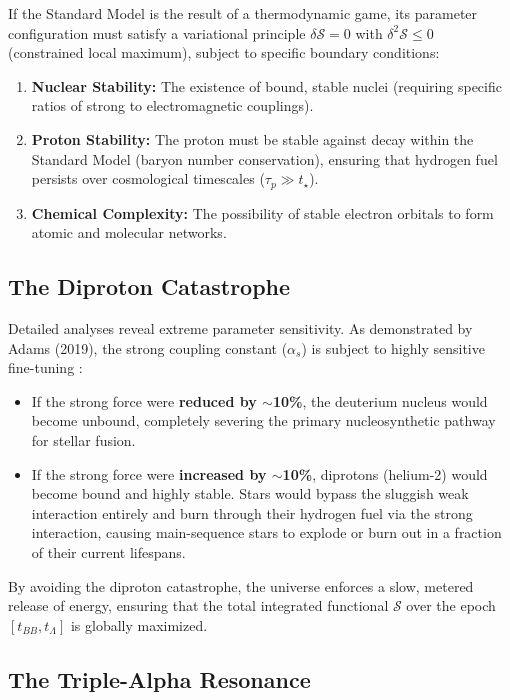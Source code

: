 \documentclass[12pt,a4paper]{article}
\theoremstyle{remark}
\begin{document}
If the Standard Model is the result of a thermodynamic game, its parameter configuration must satisfy a variational principle $\delta \mathcal{S} = 0$ with $\delta^2 \mathcal{S} \leq 0$ (constrained local maximum), subject to specific boundary conditions:
\begin{enumerate}
    \item \textbf{Nuclear Stability:} The existence of bound, stable nuclei (requiring specific ratios of strong to electromagnetic couplings).
    \item \textbf{Proton Stability:} The proton must be stable against decay within the Standard Model (baryon number conservation), ensuring that hydrogen fuel persists over cosmological timescales ($\tau_p \gg t_\star$).
    \item \textbf{Chemical Complexity:} The possibility of stable electron orbitals to form atomic and molecular networks.
\end{enumerate}

\subsection{The Diproton Catastrophe}

Detailed analyses reveal extreme parameter sensitivity. As demonstrated by Adams (2019), the strong coupling constant ($\alpha_s$) is subject to highly sensitive fine-tuning \citep{Adams2019}:

\begin{itemize}
    \item If the strong force were \textbf{reduced by $\sim$10\%}, the deuterium nucleus would become unbound, completely severing the primary nucleosynthetic pathway for stellar fusion.
    \item If the strong force were \textbf{increased by $\sim$10\%}, diprotons (helium-2) would become bound and highly stable. Stars would bypass the sluggish weak interaction entirely and burn through their hydrogen fuel via the strong interaction, causing main-sequence stars to explode or burn out in a fraction of their current lifespans.
\end{itemize}

By avoiding the diproton catastrophe, the universe enforces a slow, metered release of energy, ensuring that the total integrated functional $\mathcal{S}$ over the epoch $[t_{BB}, t_\Lambda]$ is globally maximized.

\subsection{The Triple-Alpha Resonance}
\end{document}
